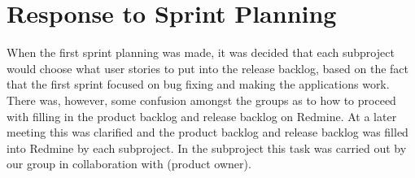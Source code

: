 \section{Response to Sprint Planning}
When the first sprint planning was made, it was decided that each subproject would choose what user stories to put into the release backlog, based on the fact that the first sprint focused on bug fixing and making the applications work. There was, however, some confusion amongst the groups as to how to proceed with filling in the product backlog and release backlog on Redmine. At a later meeting this was clarified and the product backlog and release backlog was filled into Redmine by each subproject. In the \bd subproject this task was carried out by our group in collaboration with  (\bd product owner).